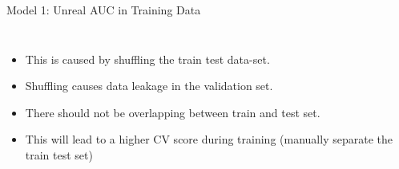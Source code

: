 \documentclass{beamer}
\begin{document}
\begin{frame}{Model 1: Unreal AUC in Training Data}
\begin{columns}
    \begin{itemize}
    \item This is caused by shuffling the train test data-set.
    \item Shuffling causes data leakage in the validation set.
    \item There should not be overlapping between train and test set.
    \item This will lead to a higher CV score during training (manually separate the train test set)
 
    \end{itemize}

    
  \end{columns}

\end{frame}
\end{document}
